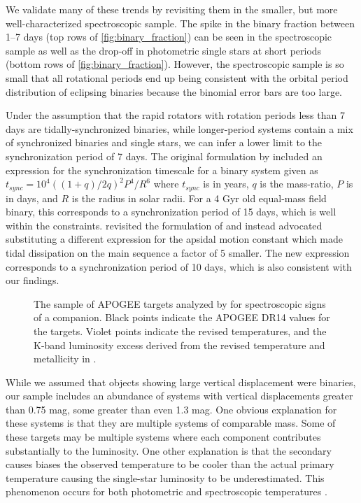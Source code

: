 \documentclass[manuscript]{aastex6}
\begin{document}
We validate many of these trends by revisiting them in the smaller, but more
well-characterized spectroscopic sample. The spike in the binary fraction
between 1--7 days (top rows of \cref{fig:binary_fraction}) can be seen in the 
spectroscopic sample as well as the drop-off in photometric single stars at
short periods (bottom rows of \cref{fig:binary_fraction}). However, the
spectroscopic sample is so small that all rotational periods end up being
consistent with the orbital period distribution of eclipsing binaries because
the binomial error bars are too large.

Under the assumption that the rapid rotators with rotation periods less than 7
days are tidally-synchronized binaries, while longer-period systems contain a
mix of synchronized binaries and single stars, we can infer a lower limit
to the synchronization period of 7 days. The original formulation by
\citep{Zahn77} included an expression for the synchronization timescale for a
binary system given as \(t_{sync} = 10^4 ((1+q)/2q)^2 P^4 / R^6\) where \(t_{sync}\) is
in years, \(q\) is the mass-ratio, \(P\) is in days, and \(R\) is the radius in
solar radii. For a 4 Gyr old equal-mass field binary, this
corresponds to a synchronization period of 15 days, which is well within the
constraints. \citet{Claret97} revisited the formulation of \citet{Zahn77} and
instead advocated substituting a different expression for the apsidal motion 
constant which made tidal dissipation on the main sequence a factor of 5
smaller. The new expression corresponds to a synchronization period of 10 days,
which is also consistent with our findings.

\begin{figure}[htb]
    \centering
    \caption{The sample of APOGEE targets analyzed by \citet{ElBadry18b} for
    spectroscopic signs of a companion. Black points indicate the APOGEE DR14 
values for the targets. Violet points indicate the revised temperatures, and the
K-band luminosity excess derived from the revised temperature and metallicity
in \citet{ElBadry18b}.}
    \label{fig:elbadry_excess}
\end{figure}

While we assumed that objects showing large vertical displacement were
binaries, our sample includes an abundance of systems with vertical
displacements greater than 0.75 mag, some greater than even 1.3 mag. One
obvious explanation for these systems is that they are multiple systems of
comparable mass. Some of these targets may be multiple systems where each
component contributes substantially to the luminosity. One other explanation is 
that the secondary causes biases the observed temperature to be cooler than the 
actual primary temperature causing the single-star luminosity to be 
underestimated. This phenomenon occurs for both photometric and spectroscopic 
temperatures \citep{Pinsonneault12,ElBadry18a}. 
\end{document}
